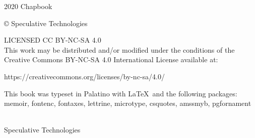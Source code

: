 



\pagestyle{empty}

\mainmatter
\raggedbottom

{
\null\vfill

\begin{flushleft}

{\small

{\variexfont{}2020 Chapbook}

© {\tubefont{}Speculative Technologies}


\bigskip

LICENSED CC BY-NC-SA 4.0 \\
This work may be distributed and/or modified under the conditions of the Creative Commons BY-NC-SA 4.0 International License available at:
\begin{monotype}
https://creativecommons.org/licenses/by-nc-sa/4.0/
\end{monotype}

This book was typeset in Palatino with \LaTeX\ and the following packages:
  memoir,
  fontenc,
  fontaxes,
  lettrine,
  microtype,
  csquotes,
  amssmyb,
  pgfornament
\bigskip
}
\end{flushleft}
}

\clearpage
\pagestyle{plain}

\begingroup%
\centering
\vspace*{24pt}
{\HUGE {}}\\[\baselineskip]
{\Huge \tubefont Speculative Technologies}\\[\baselineskip]
\vfill\null
\endgroup



{\setlength{\beforechapskip}{0pt}
\begin{KeepFromToc}
  \tableofcontents*
\end{KeepFromToc}
}


\clearpage

